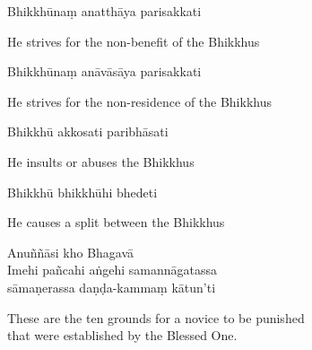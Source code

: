 Bhikkhūnaṃ anatthāya parisakkati

\begin{english}
  He strives for the non-benefit of the Bhikkhus
\end{english}

Bhikkhūnaṃ anāvāsāya parisakkati

\begin{english}
  He strives for the non-residence of the Bhikkhus
\end{english}

Bhikkhū akkosati paribhāsati

\begin{english}
  He insults or abuses the Bhikkhus
\end{english}

Bhikkhū bhikkhūhi bhedeti

\begin{english}
  He causes a split between the Bhikkhus
\end{english}

Anuññāsi kho Bhagavā\\
Imehi pañcahi aṅgehi samannāgatassa\\
sāmaṇerassa daṇḍa-kammaṃ kātun'ti

\begin{english}
  These are the ten grounds for a novice to be punished\\
  that were established by the Blessed One.
\end{english}


